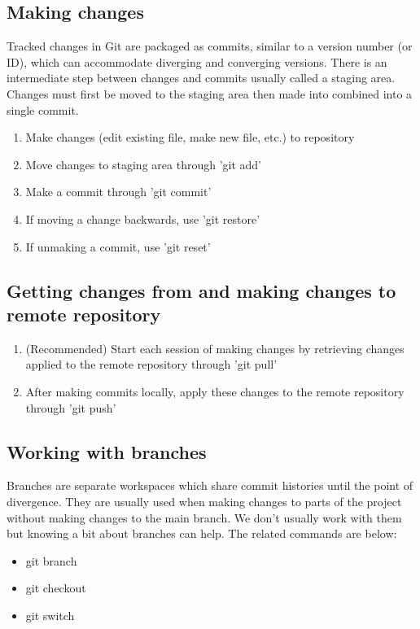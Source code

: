 \documentclass[11pt]{article}
\begin{document}
\subsection{Making changes}
Tracked changes in Git are packaged as commits, similar to a version number (or ID), which can accommodate diverging and converging versions. There is an intermediate step between changes and commits usually called a staging area. Changes must first be moved to the staging area then made into combined into a single commit.

\begin{enumerate}
 \item Make changes (edit existing file, make new file, etc.) to repository
 \item Move changes to staging area through 'git add'
 \item Make a commit through 'git commit'
 \item If moving a change backwards, use 'git restore'
 \item If unmaking a commit, use 'git reset'
\end{enumerate}

\subsection{Getting changes from and making changes to remote repository}
\begin{enumerate}
  \item (Recommended) Start each session of making changes by retrieving changes applied to the remote repository through 'git pull'
  \item After making commits locally, apply these changes to the remote repository through 'git push'
\end{enumerate}

\subsection{Working with branches}
Branches are separate workspaces which share commit histories until the point of divergence. They are usually used when making changes to parts of the project without making changes to the main branch. We don't usually work with them but knowing a bit about branches can help. The related commands are below:

\begin{itemize}
  \item git branch
  \item git checkout
  \item git switch
\end{itemize}
\end{document}

